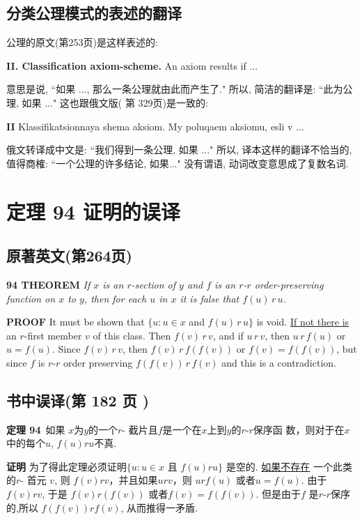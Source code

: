 \documentclass[zihao=-4,a4paper]{ctexart}
\begin{document}
\subsection{分类公理模式的表述的翻译}
公理的原文(\cite{enderton1977}第253页)是这样表述的:

{\bf II. Classification axiom-scheme.} An axiom results if ... 

\noindent 意思是说, “如果 ...,
那么一条公理就由此而产生了." 所以, 简洁的翻译是: “此为公理, 如果 ..."
这也跟俄文版(\cite{jkelley1968ru} 第 329页)是一致的: 

{\bf II}  {\selectfont 
Klassifika{ts}ionna{ya}   {s}hema aksiom.
	My poluqaem aksiomu, esli v ...
}

\noindent 俄文转译成中文是: “我们得到一条公理, 如果 ..."
所以, 译本这样的翻译不恰当的,值得商榷: “一个公理的许多结论, 如果..." 没有谓语, 动词改变意思成了复数名词.

\section{定理 94 证明的误译}

\subsection{原著英文(\cite{jkelley1975}第264页)} 
{\bf 94 THEOREM} 
{\sl
	If $x$ is an $r$-section of $y$ and $f$ is an $r$-$r$ order-preserving function on $x$ to $y$, 
	then for each $u$ in $x$ it is false that $f(u)\, r\, u$.
}

{\bf PROOF}
It must be shown that $\{u: u \in x $ and $ f(u) \, r\, u\}$ is void. 
\underline{If not there is} an $r$-first member $v$ of this class.
Then $f(v)\, r\, v $, and if $u\, r\, v$, then $u\, r\, f(u)$ or $u = f(u)$.
Since $f(v)\, r\, v$, then 
\underline{$f(v)\, r\, f(f(v))$}
or $f(v) = f(f(v))$, but since $f$ is $r$-$r$ order preserving
$f(f(v))\, r\, f(v)$ and this is a contradiction.

\subsection{书中误译(\cite{jkelley2010zh}第 182 页 )} 
{\bf 定理 94}\,
{\kaishu
如果 $x$为$y$的一个$r$- 截片且$f$是一个在$x$上到$y$的$r$-$r$保序函
数，则对于在$x$中的每个$u$, $f(u)ru$不真.
}

{\bf 证明}
为了得此定理必须证明$\{u: u \in x $ 且 $ f(u) ru\}$ 是空的. 
\underline{如果不存在}\! 一个此类的$r$- 首元 $v$, 
则 $f(v) r  v $，并且如果$u r v$，则 $u r f(u)$
或者$u = f(u)$.
由于$f(v)rv$, 于是
\underline{$f(v)r(f(v))$}
或者$f(v)=f(f(v))$. 但是由于$f$ 是$r$-$r$保序的,所以
$f(f(v))rf(v)$, 从而推得一矛盾.
\end{document}
